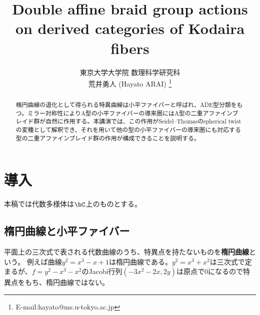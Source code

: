 \documentclass[uplatex,11pt,a4paper,dvipdfmx]{jsarticle}
\title{Double affine braid group actions on derived categories of Kodaira fibers}    %
\author{東京大学大学院 数理科学研究科 \\
荒井勇人 (Hayato ARAI) 
\footnote{E-mail:hayato@ms.u-tokyo.ac.jp}}
\date{}    %
\numberwithin{equation}{section}
\numberwithin{figure}{section}
\theoremstyle{definition}
\begin{document}
\maketitle

\begin{abstract}   %
    楕円曲線の退化として得られる特異曲線は小平ファイバーと呼ばれ、ADE型分類をもつ。ミラー対称性によりA型の小平ファイバーの導来圏にはA型の二重アファインブレイド群が自然に作用する。本講演では、この作用がSeidel--Thomasのspherical twistの変種として解釈でき、それを用いて他の型の小平ファイバーの導来圏にも対応する型の二重アファインブレイド群の作用が構成できることを説明する。
\end{abstract}


\section{導入}
本稿では代数多様体は$\bC$上のものとする。
\subsection{楕円曲線と小平ファイバー}

平面上の三次式で表される代数曲線のうち、特異点を持たないものを\textbf{楕円曲線}という。
例えば曲線$y^2 = x^3 - x + 1$は楕円曲線である。$y^2 = x^3 + x^2$は三次式で定まるが、$f = y^2-x^3 - x^2$のJacobi行列$(-3x^2-2x, 2y)$は原点で$0$になるので特異点をもち、楕円曲線ではない。
\end{document}
